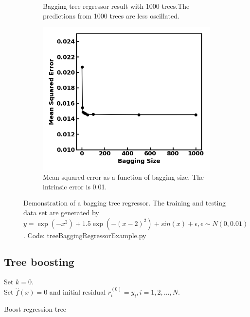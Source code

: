 \begin{refsection}
\begin{figure}[H]
\begin{subfigure}[b]{0.42\textwidth}
	\caption{Bagging tree regressor result with 1000 trees.The predictions from 1000 trees are less oscillated. }
\end{subfigure}\quad
	\begin{subfigure}[b]{0.42\textwidth}
		\centering
		\includegraphics[width=1\linewidth]{../figures/statisticalLearning/treeMethods/BaggingTreeRegressorExampleAccuracy}
		\caption{Mean squared error as a function of bagging size. The intrinsic error is 0.01.}
		\label{fig:BaggingTreeRegressionDemo}
	\end{subfigure}
	\caption{Demonstration of a bagging tree regressor. The training and testing data set are generated by $y = \exp(-x^2) + 1.5\exp(-(x-2)^2) + sin(x) + \epsilon, \epsilon\sim N(0,0.01)$. Code: treeBaggingRegressorExample.py}
\end{figure}

\subsection{Tree boosting}



\begin{algorithm}[H]
	\SetAlgoLined
	Set $k = 0$. \\
	Set $\hat{f}(x) = 0$ and initial residual $r_i^{(0)} = y_i, i=1,2,...,N$.
	\caption{Boost regression tree}
\end{algorithm}



\end{refsection}
